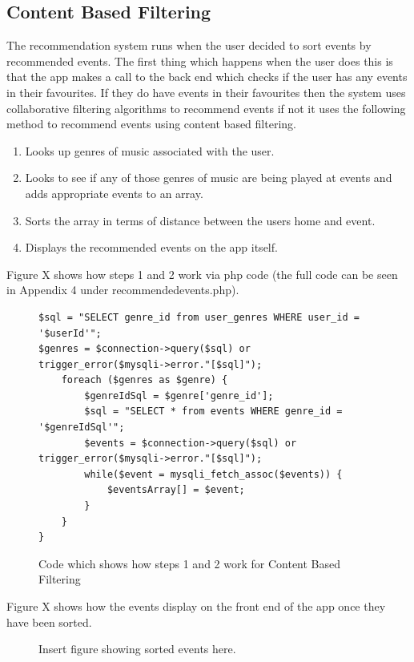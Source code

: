 \subsection{Content Based Filtering}
The recommendation system runs when the user decided to sort events by recommended events. The first thing which happens when the user does this is that the app makes a call to the back end which checks if the user has any events in their favourites. If they do have events in their favourites then the system uses collaborative filtering algorithms to recommend events if not it uses the following method to recommend events using content based filtering.
\begin{enumerate}
  \item Looks up genres of music associated with the user.
  \item Looks to see if any of those genres of music are being played at events and adds appropriate events to an array.
  \item Sorts the array in terms of distance between the users home and event.
  \item Displays the recommended events on the app itself.
\end{enumerate}
Figure X shows how steps 1 and 2 work via php code (the full code can be seen in Appendix 4 under recommendedevents.php).
\begin{figure}
\begin{verbatim}
$sql = "SELECT genre_id from user_genres WHERE user_id = '$userId'";
$genres = $connection->query($sql) or trigger_error($mysqli->error."[$sql]");
    foreach ($genres as $genre) {
        $genreIdSql = $genre['genre_id'];
        $sql = "SELECT * from events WHERE genre_id = '$genreIdSql'";
        $events = $connection->query($sql) or trigger_error($mysqli->error."[$sql]");
        while($event = mysqli_fetch_assoc($events)) {
            $eventsArray[] = $event;
        }
    }
}
\end{verbatim}
\caption{Code which shows how steps 1 and 2 work for Content Based Filtering}
\end{figure}
Figure X shows how the events display on the front end of the app once they have been sorted.
\begin{figure}
\caption{Insert figure showing sorted events here.}
\end{figure}

